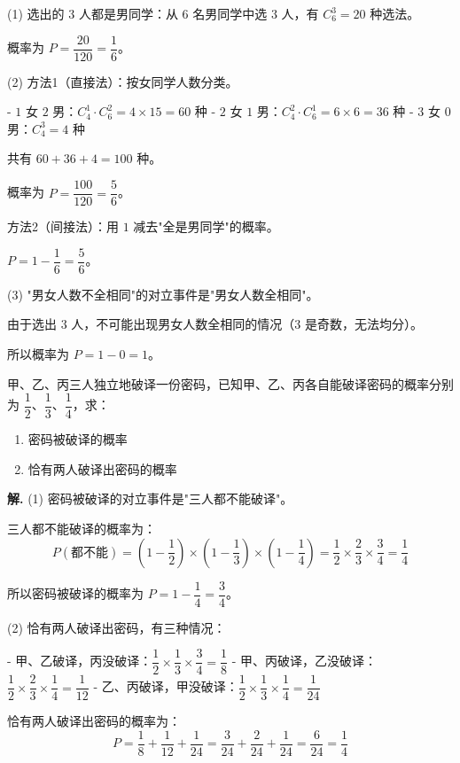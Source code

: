 \documentclass[11pt]{ctexrep}
\begin{document}
(1) 选出的 $3$ 人都是男同学：从 $6$ 名男同学中选 $3$ 人，有 $C_6^3 = 20$ 种选法。

概率为 $P = \dfrac{20}{120} = \dfrac{1}{6}$。

(2) 方法1（直接法）：按女同学人数分类。

- $1$ 女 $2$ 男：$C_4^1 \cdot C_6^2 = 4 \times 15 = 60$ 种
- $2$ 女 $1$ 男：$C_4^2 \cdot C_6^1 = 6 \times 6 = 36$ 种
- $3$ 女 $0$ 男：$C_4^3 = 4$ 种

共有 $60 + 36 + 4 = 100$ 种。

概率为 $P = \dfrac{100}{120} = \dfrac{5}{6}$。

方法2（间接法）：用 $1$ 减去"全是男同学"的概率。

$P = 1 - \dfrac{1}{6} = \dfrac{5}{6}$。

(3) "男女人数不全相同"的对立事件是"男女人数全相同"。

由于选出 $3$ 人，不可能出现男女人数全相同的情况（$3$ 是奇数，无法均分）。

所以概率为 $P = 1 - 0 = 1$。

\begin{example}[分步计数与条件概率]
    甲、乙、丙三人独立地破译一份密码，已知甲、乙、丙各自能破译密码的概率分别为 $\dfrac{1}{2}$、$\dfrac{1}{3}$、$\dfrac{1}{4}$，求：
    \begin{enumerate}
        \item 密码被破译的概率
        \item 恰有两人破译出密码的概率
    \end{enumerate}
\end{example}

\textbf{解.} (1) 密码被破译的对立事件是"三人都不能破译"。

三人都不能破译的概率为：
\[
    P(\text{都不能}) = \left(1 - \frac{1}{2}\right) \times \left(1 - \frac{1}{3}\right) \times \left(1 - \frac{1}{4}\right) = \frac{1}{2} \times \frac{2}{3} \times \frac{3}{4} = \frac{1}{4}
\]

所以密码被破译的概率为 $P = 1 - \dfrac{1}{4} = \dfrac{3}{4}$。

(2) 恰有两人破译出密码，有三种情况：

- 甲、乙破译，丙没破译：$\dfrac{1}{2} \times \dfrac{1}{3} \times \dfrac{3}{4} = \dfrac{1}{8}$
- 甲、丙破译，乙没破译：$\dfrac{1}{2} \times \dfrac{2}{3} \times \dfrac{1}{4} = \dfrac{1}{12}$
- 乙、丙破译，甲没破译：$\dfrac{1}{2} \times \dfrac{1}{3} \times \dfrac{1}{4} = \dfrac{1}{24}$

恰有两人破译出密码的概率为：
\[
    P = \frac{1}{8} + \frac{1}{12} + \frac{1}{24} = \frac{3}{24} + \frac{2}{24} + \frac{1}{24} = \frac{6}{24} = \frac{1}{4}
\]
\end{document}
